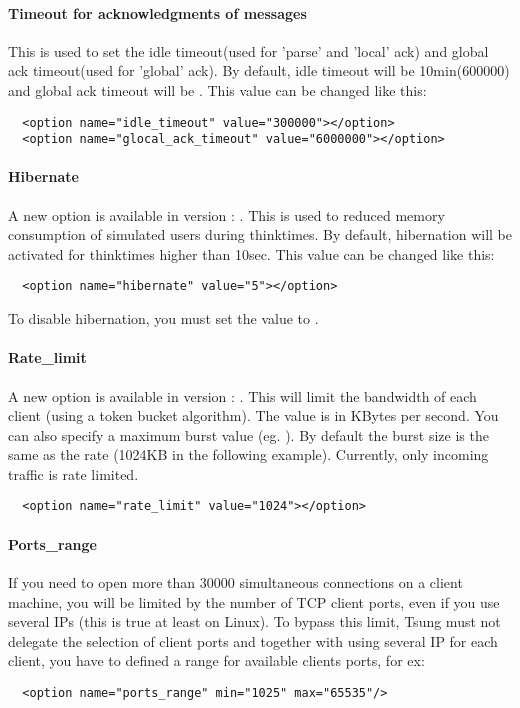 \documentclass{TSUNG-en}
\begin{document}
\paragraph{Timeout for acknowledgments of messages}

This is used to set the idle timeout(used for 'parse' and 'local' ack) and
global ack timeout(used for 'global' ack). By default, idle timeout will be
10min(600000) and global ack timeout will be . This value
can be changed like this:

\begin{Verbatim}
  <option name="idle_timeout" value="300000"></option>
  <option name="glocal_ack_timeout" value="6000000"></option>
\end{Verbatim}

\paragraph{Hibernate}

A new option is available in version : . This
is used to reduced memory consumption of simulated users during
thinktimes. By default, hibernation will be activated for thinktimes
higher than 10sec. This value can be changed like this:

\begin{Verbatim}
  <option name="hibernate" value="5"></option>
\end{Verbatim}

To disable hibernation, you must set the value to .

\paragraph{Rate\_limit}

A new option is available in version :
. This will limit the bandwidth of each client
(using a token bucket algorithm). The value is in KBytes per
second. You can also specify a maximum burst value
(eg. ). By default the burst size is the same as
the rate (1024KB in the following example). Currently, only incoming
traffic is rate limited.

\begin{Verbatim}
  <option name="rate_limit" value="1024"></option>
\end{Verbatim}

\paragraph{Ports\_range}
If you need to open more than 30000 simultaneous connections on a
client machine, you will be limited by the number of TCP client ports,
even if you use several IPs (this is true at least on Linux). To
bypass this limit, Tsung must not delegate the selection of client
ports and together with using several IP for each client,
you have to defined a range for available clients ports, for ex:
\begin{Verbatim}
  <option name="ports_range" min="1025" max="65535"/>
\end{Verbatim}
\end{document}
